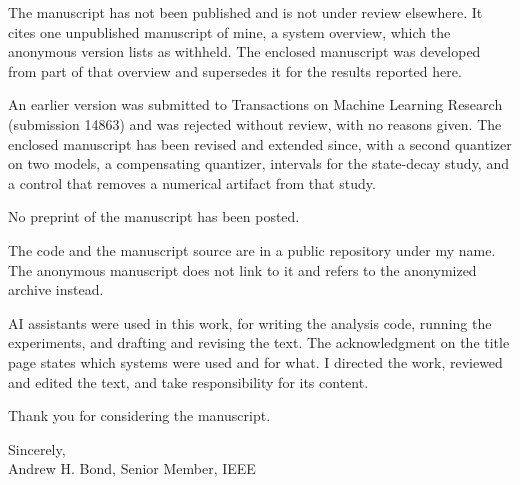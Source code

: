 \documentclass[11pt]{article}
\begin{document}
The manuscript has not been published and is not under review elsewhere. It cites one
unpublished manuscript of mine, a system overview, which the anonymous version lists as
withheld.
The enclosed manuscript was developed from part of that overview and supersedes it for the
results reported here.

An earlier version was submitted to Transactions on Machine Learning Research (submission
14863) and was rejected without review, with no reasons given. The enclosed manuscript has
been revised and extended since, with a second quantizer on two models, a compensating
quantizer, intervals for the state-decay study, and a control that removes a numerical
artifact from that study.

No preprint of the manuscript has been posted.

The code and the manuscript source are in a public repository under my name. The anonymous
manuscript does not link to it and refers to the anonymized archive instead.

AI assistants were used in this work, for writing the analysis code, running the experiments,
and drafting and revising the text. The acknowledgment on the title page states which systems
were used and for what. I directed the work, reviewed and edited the text, and take
responsibility for its content.


Thank you for considering the manuscript.

Sincerely,\\[1.2em]
Andrew H. Bond, Senior Member, IEEE
\end{document}
